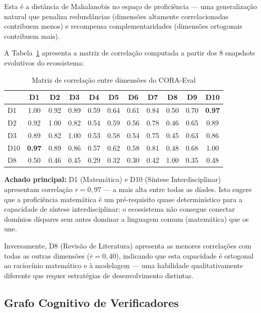 Esta é a distância de Mahalanobis no espaço de proficiência — uma generalização
natural que penaliza redundâncias (dimensões altamente correlacionadas
contribuem menos) e recompensa complementaridades (dimensões ortogonais
contribuem mais).

A Tabela~\ref{tab:corr_matrix} apresenta a matriz de correlação computada
a partir dos 8 snapshots evolutivos do ecossistema:

\begin{table}[H]\centering
\caption{Matriz de correlação entre dimensões do CORA-Eval}
\label{tab:corr_matrix}
\begin{tabular}{lcccccccccc}
\toprule
 & \textbf{D1} & \textbf{D2} & \textbf{D3} & \textbf{D4} & \textbf{D5} & \textbf{D6} & \textbf{D7} & \textbf{D8} & \textbf{D9} & \textbf{D10} \\
\midrule
D1  & 1.00 & 0.92 & 0.89 & 0.59 & 0.64 & 0.61 & 0.84 & 0.50 & 0.70 & \textbf{0.97} \\
D2  & 0.92 & 1.00 & 0.82 & 0.54 & 0.59 & 0.56 & 0.78 & 0.46 & 0.65 & 0.89 \\
D3  & 0.89 & 0.82 & 1.00 & 0.53 & 0.58 & 0.54 & 0.75 & 0.45 & 0.63 & 0.86 \\
D10 & \textbf{0.97} & 0.89 & 0.86 & 0.57 & 0.62 & 0.58 & 0.81 & 0.48 & 0.68 & 1.00 \\
D8  & 0.50 & 0.46 & 0.45 & 0.29 & 0.32 & 0.30 & 0.42 & 1.00 & 0.35 & 0.48 \\
\bottomrule
\end{tabular}
\end{table}

\textbf{Achado principal:} D1 (Matemática) e D10 (Síntese Interdisciplinar)
apresentam correlação $r = 0,97$ — a mais alta entre todas as díades. Isto
sugere que a proficiência matemática é um pré-requisito quase determinístico
para a capacidade de síntese interdisciplinar: o ecossistema não consegue
conectar domínios díspares sem antes dominar a linguagem comum (matemática)
que os une.

Inversamente, D8 (Revisão de Literatura) apresenta as menores correlações com
todas as outras dimensões ($\bar{r} = 0,40$), indicando que esta capacidade é
ortogonal ao raciocínio matemático e à modelagem — uma habilidade
qualitativamente diferente que requer estratégias de desenvolvimento distintas.

\subsection{Grafo Cognitivo de Verificadores}

